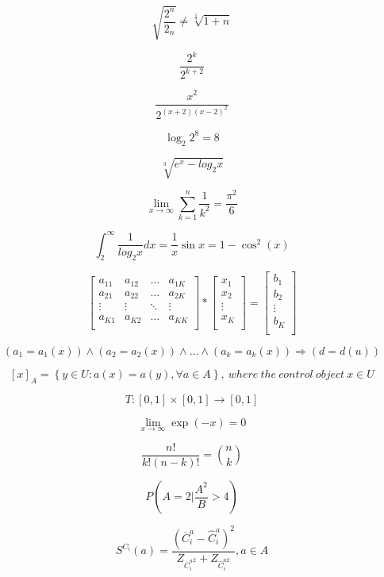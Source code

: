 \documentclass[a4paper]{article}
\begin{document}
$$ \sqrt{ \frac{2^{n}}{2_n}} \neq \sqrt[\frac{1}{3}]{1+n} $$

$$ \frac{2^{k}}{2^{k+2}} $$

$$ \frac{x^{2}}{2^{(x+2)(x-2)^{2}}} $$

$$ \log_{2} 2^{8} = 8 $$

$$ \sqrt[3]{e^{x}-log_{2}x} $$

$$ \lim_{x \to \infty} \sum_{k=1}^{n} \frac{1}{k^{2}} = \frac{\pi^{2}}{6} $$

$$ \int_{2}^{\infty} \frac{1}{log_{2}x}dx = \frac{1}{x} \sin{x} = 1 - \cos^{2}{(x)} $$

$$ \left[ \begin{array}{cccc}
a_{11} & a_{12} & \ldots & a_{1K} \\
a_{21} & a_{22} & \ldots & a_{2K} \\
\vdots & \vdots & \ddots & \vdots \\
a_{K1} & a_{K2} & \ldots & a_{KK} \\
\end{array} \right] 
*
\left[ \begin{array}{cccc}
x_{1} \\
x_{2} \\
\vdots \\
x_{K} \\
\end{array} \right]
=
\left[ \begin{array}{cccc}
b_{1} \\
b_{2} \\
\vdots \\
b_{K} \\
\end{array} \right]
$$

$$ (a_{1} = a_{1}(x)) \wedge (a_{2} = a_{2}(x)) \wedge \ldots \wedge (a_{k}= a_{k}(x)) \Rightarrow (d = d (u))  $$

$$  [x]_{A} = \left\lbrace y \in U : a (x) = a (y), \forall{a} \in A \right\rbrace , \ where \ the \ control \ object \ x \in U  $$

$$ T:[0,1] \times [0,1] \rightarrow [0,1] $$

$$ \lim_{x \to \infty} \exp (-x) = 0 $$

$$ \frac{n!}{k! (n-k)!} = {n \choose k}  $$

$$ P \left( A = 2 \bigg| \frac{A^{2}}{B} > 4 \right) $$

$$ S^{C_{i}}(a) = \frac{(\overline{C}_{i}^{a} - \hat{C}_{i}^{a})^{2}}{Z_{{\overline{C}_{i}^{a}}^{2}} + Z_{{\hat{C}_{i}^{a2}}}} , a \in A  $$
\end{document}
